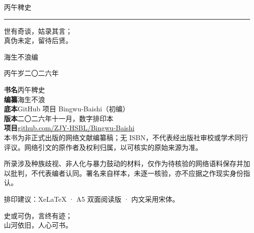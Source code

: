 \newpage
\thispagestyle{empty}
\vspace*{15mm}
\begin{center}
{\fontsize{25}{34}\selectfont{}丙午稗史}\par
\vspace{10mm}
{\color{oldgold}\rule{52mm}{0.7pt}}\par
\vspace{7mm}
{\Large 世有奇谈，姑录其言；\\[5pt]真伪未定，留待后贤。}\par
\end{center}
\vfill
\begin{center}
{\large 海生不浪\quad 编}\par
\vspace{4mm}
{\small 丙午岁\quad 二〇二六年}\par
\end{center}
\vspace*{14mm}
\clearpage
\thispagestyle{empty}
\vspace*{38mm}
{\small\color{muted}
\noindent\textbf{书名}\quad 丙午稗史\\[6pt]
\noindent\textbf{编纂}\quad 海生不浪\\[6pt]
\noindent\textbf{底本}\quad GitHub 项目 Bingwu-Baishi（初编）\\[6pt]
\noindent\textbf{版本}\quad 二〇二六年十一月，数字排印本\\[6pt]
\noindent\textbf{项目}\quad \href{https://github.com/ZJY-HSBL/Bingwu-Baishi}{github.com/ZJY-HSBL/Bingwu-Baishi}\\[10pt]
\noindent 本书为非正式出版的网络文献编纂稿；无 ISBN，不代表经出版社审校或学术同行评议。网络引文的原作者及权利归属，以可核实的原始来源为准。
\par\vspace{9mm}
\noindent 所录涉及种族歧视、非人化与暴力鼓动的材料，仅作为待核验的网络语料保存并加以批判，不代表编者认同。署名来自样本，未逐一核验，亦不应据之作现实身份指认。
}
\vfill
\noindent{\color{oldgold}\rule{\textwidth}{0.5pt}}
{\footnotesize\color{muted}排印建议：XeLaTeX · A5 双面阅读版 · 内文采用宋体。}
\clearpage
\thispagestyle{empty}
\vspace*{57mm}
\begin{center}
\color{wine}\fontsize{19}{33}\selectfont
史或可伪，言终有迹；\\
山河依旧，人心可书。
\end{center}
\vspace*{48mm}
\clearpage
